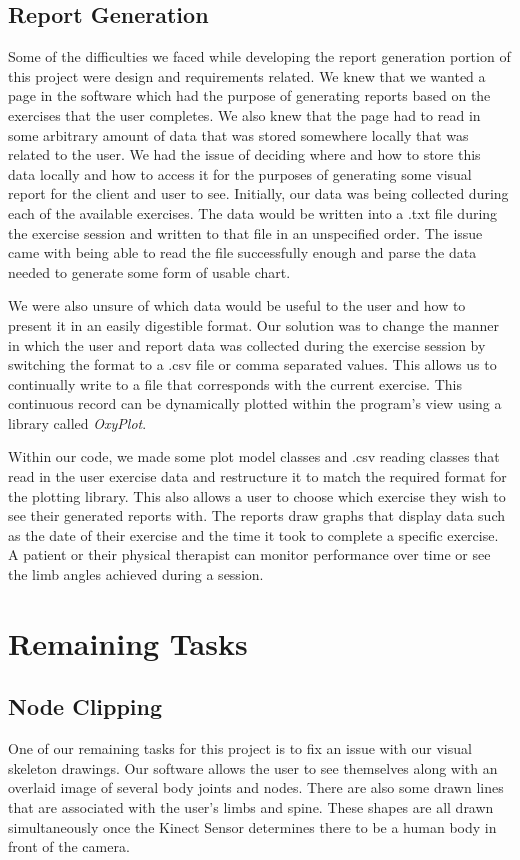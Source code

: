 \documentclass[onecolumn, draftclsnofoot,10pt, compsoc]{IEEEtran}
\begin{document}
\subsection{Report Generation}
Some of the difficulties we faced while developing the report generation portion of this project were design and requirements related. We knew that we wanted a page in the software which had the purpose of generating reports based on the exercises that the user completes. We also knew that the page had to read in some arbitrary amount of data that was stored somewhere locally that was related to the user. We had the issue of deciding where and how to store this data locally and how to access it for the purposes of generating some visual report for the client and user to see. Initially, our data was being collected during each of the available exercises. The data would be written into a .txt file during the exercise session and written to that file in an unspecified order. The issue came with being able to read the file successfully enough and parse the data needed to generate some form of usable chart. 

We were also unsure of which data would be useful to the user and how to present it in an easily digestible format. Our solution was to change the manner in which the user and report data was collected during the exercise session by switching the format to a .csv file or comma separated values. This allows us to continually write to a file that corresponds with the current exercise. This continuous record can be dynamically plotted within the program's view using a library called \textit{OxyPlot}\cite{OxyPlot}. 

Within our code, we made some plot model classes and .csv reading classes that read in the user exercise data and restructure it to match the required format for the plotting library. This also allows a user to choose which exercise they wish to see their generated reports with. The reports draw graphs that display data such as the date of their exercise and the time it took to complete a specific exercise. A patient or their physical therapist can monitor performance over time or see the limb angles achieved during a session\cite{csvFile}.

\section{Remaining Tasks}
\subsection{Node Clipping}
One of our remaining tasks for this project is to fix an issue with our visual skeleton drawings. Our software allows the user to see themselves along with an overlaid image of several body joints and nodes. There are also some drawn lines that are associated with the user's limbs and spine. These shapes are all drawn simultaneously once the Kinect Sensor determines there to be a human body in front of the camera. 
\end{document}

